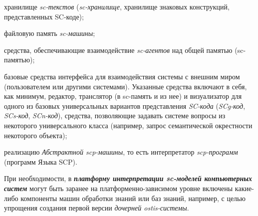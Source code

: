 \begin{SCn}
{\begin{scnitemize}
    \item хранилище \textit{sc-текстов} (\textit{sc-хранилище}, хранилище знаковых конструкций, представленных SC-коде);
    \item файловую память \textit{sc-машины};
    \item средства, обеспечивающие взаимодействие \textit{sc-агентов} над общей памятью (sc-памятью);
    \item базовые средства интерфейса для взаимодействия системы с внешним миром (пользователем или другими системами). Указанные средства включают в себя, как минимум, редактор, транслятор (в sc-память и из нее) и визуализатор для одного из базовых универсальных вариантов представления \textit{SC-кода} (\textit{SCg-код}, \textit{SCs-код}, \textit{SCn-код}), средства, позволяющие задавать системе вопросы из некоторого универсального класса (например, запрос семантической окрестности некоторого объекта);
    \item реализацию \textit{Абстрактной scp-машины}, то есть интерпретатор \textit{scp-программ} (программ Языка SCP).
\end{scnitemize}
При необходимости, в \textbf{\textit{платформу интерпретации sc-моделей компьютерных систем}} могут быть заранее на платформенно-зависимом уровне включены какие-либо компоненты машин обработки знаний или баз знаний, например, с целью упрощения создания первой версии \textit{дочерней ostis-системы}.

}
\end{SCn}
